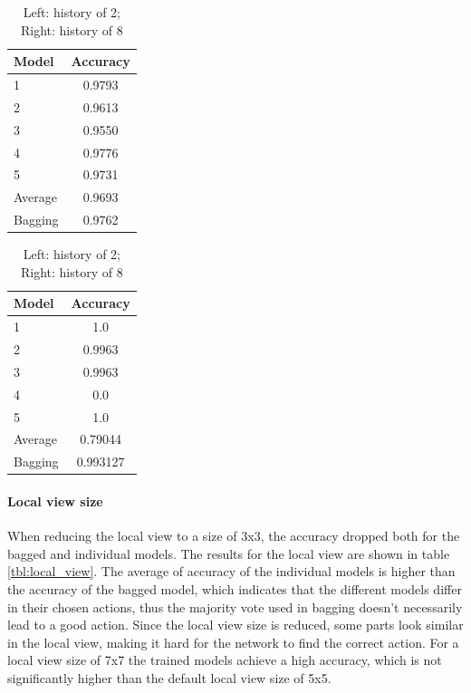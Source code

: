 \documentclass[a4paper, 11pt]{article}
\begin{document}
\begin{table}[ht]
    \centering
    \footnotesize
        \begin{tabular}[t]{p{2.5cm}c}
            \toprule
            \textbf{Model}	&	\textbf{Accuracy} \\
            \midrule
            1    &	0.9793  \\
            2	&	0.9613 \\
            3 	&	0.9550 \\
            4 	&	0.9776 \\
            5 	&	0.9731 \\
            \midrule
            Average 	&	0.9693 \\
            \midrule
            Bagging 	&	 0.9762\\
            \bottomrule

        \end{tabular}
        \begin{tabular}[t]{p{2.5cm}c}
            \toprule
            \textbf{Model}	&	\textbf{Accuracy} \\
            \midrule
            1   &	1.0 \\
            2	&	0.9963 \\
            3 	&	0.9963 \\
            4 	&	0.0 \\
            5 	&	1.0 \\
            \midrule
            Average 	&	0.79044 \\
            \midrule
            Bagging 	&	 0.993127\\
            \bottomrule
        \end{tabular}
        \caption{Left: history of 2; Right: history of 8}
        \label{tbl:hist2}
    \end{table}


\paragraph{Local view size}
When reducing the local view to a size of 3x3, the accuracy dropped both for the bagged and individual models. The results for the local view are shown in table \ref{tbl:local_view}. The average of accuracy of the individual models is higher than the accuracy of the bagged model, which indicates that the different models differ in their chosen actions, thus the majority vote used in bagging doesn't necessarily lead to a good action. Since the local view size is reduced, some parts look similar in the local view, making it hard for the network to find the correct action.
For a local view size of 7x7 the trained models achieve a high accuracy, which is not significantly higher than the default local view size of 5x5.
\end{document}
